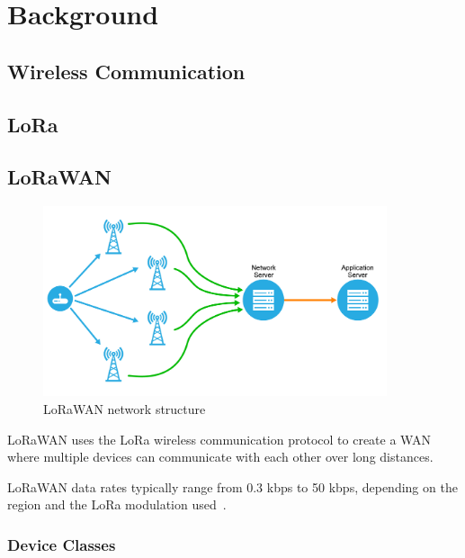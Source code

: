 \chapter{Background}

\section{Wireless Communication}
\section{\acf{LoRa}}


\section{\acf{LoRaWAN}}


\begin{figure}[h]
    \centering
    \includegraphics[width=0.9\textwidth]{pictures/lorawan-structure/topology_semtech_developers.png}
    \caption{\ac{LoRaWAN} network structure~\protect\cite{semtech_lora_developer_portal_-depth_nodate}}
    \label{pic:lorawan-network-structure}
\end{figure}

\ac{LoRaWAN} uses the LoRa wireless communication protocol to create a \ac{WAN} where multiple devices can communicate with each other over long distances.

\ac{LoRaWAN} data rates typically range from 0.3 kbps to 50 kbps, depending on the region and the \ac{LoRa} modulation used~\cite[p. 8]{lora_alliance_inc_lorawan_2017}.




\subsection{Device Classes}

